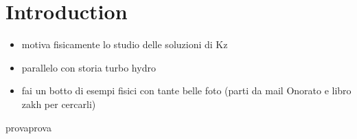 

\newpage
\vphantom{}
\section*{Introduction}
\begin{itemize}
    \item motiva fisicamente lo studio delle soluzioni di Kz
    \item parallelo con storia turbo hydro
    \item fai un botto di esempi fisici con tante belle foto (parti da mail Onorato e libro zakh per cercarli)
\end{itemize}

\newpage
\thispagestyle{intro2}
provaprova

